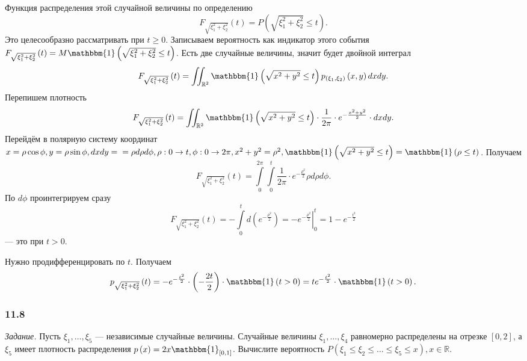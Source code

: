 Функция распределения этой случайной величины по определению
$$F_{ \sqrt{ \xi_1^2 + \xi_2^2}} \left( t \right) =
P \left( \sqrt{ \xi_1^2 + \xi_2^2} \leq t \right).$$
Это целесообразно рассматривать при $t \geq 0$.
Записываем вероятность как индикатор этого события $F_{ \sqrt{ \xi_1^2 + \xi_2^2}} \left( t \right) = M \mathbbm{1} \left( \sqrt{ \xi_1^2 + \xi_2^2} \leq t \right) $.
Есть две случайные величины, значит будет двойной интеграл
$$F_{ \sqrt{ \xi_1^2 + \xi_2^2}} \left( t \right) =
\iint_{ \mathbb{R}^2} \mathbbm{1} \left( \sqrt{x^2 + y^2} \leq t \right) p_{ \left( \xi_1, \xi_2 \right) } \left( x, y \right) dxdy.$$
Перепишем плотность
$$F_{ \sqrt{ \xi_1^2 + \xi_2^2}} \left( t \right) =
\iint_{ \mathbb{R}^2} \mathbbm{1} \left( \sqrt{x^2 + y^2} \leq t \right) \cdot \frac{1}{2 \pi } \cdot e^{- \frac{x^2 + y^2}{2}} \cdot dxdy.$$
Перейдём в полярную систему координат
$x = \rho \cos \phi,
y = \rho \sin \phi,
dxdy = \\
= \rho d \rho d \phi,
\rho: 0 \rightarrow t,
\phi: 0 \rightarrow 2 \pi,
x^2 + y^2 = \rho^2,
\mathbbm{1} \left( \sqrt{x^2 + y^2} \leq t \right) = \mathbbm{1} \left( \rho \leq t \right) $.
Получаем
$$F_{ \sqrt{ \xi_1^2 + \xi_2^2}} \left( t \right) =
\int \limits_0^{2 \pi } \int \limits_0^t \frac{1}{2 \pi } \cdot e^{- \frac{ \rho^2}{2}} \rho d \rho d \phi.$$
По $d \phi $ проинтегрируем сразу
$$F_{ \sqrt{ \xi_1^2 + \xi_2^2}} \left( t \right) =
- \int \limits_0^t d \left( e^{- \frac{ \rho^2}{2}} \right) =
\left. - e^{- \frac{ \rho^2}{2}} \right|_0^t =
1 - e^{- \frac{t^2}{2}}$$
--- это при $t > 0$.

Нужно продифференцировать по $t$.
Получаем
$$p_{ \sqrt{ \xi_1^2 + \xi_2^2}} \left( t \right) =
- e^{- \frac{t^2}{2}} \cdot \left( - \frac{2t}{2} \right) \cdot \mathbbm{1} \left( t > 0 \right) =
te^{- \frac{t^2}{2}} \cdot \mathbbm{1} \left( t > 0 \right).$$

\subsubsection*{11.8}

\textit{Задание.} Пусть $ \xi_1, \dotsc, \xi_5$ --- независимые случайные величины.
Случайные величины $ \xi_1, \dotsc, \xi_4$ равномерно распределены на отрезке $ \left[ 0, 2 \right] $,
а $ \xi_5$ имеет плотность распределения $p \left( x \right) = 2x \mathbbm{1}_{ \left[ 0, 1 \right] }$.
Вычислите вероятность $P \left( \xi_1 \leq \xi_2 \leq \dotsc \leq \xi_5 \leq x \right), x \in \mathbb{R}$.

